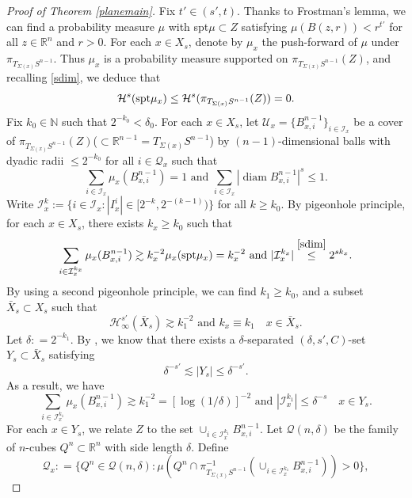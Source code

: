 \documentclass[11pt,a4paper,reqno]{amsart}
\newcommand{\R}{\mathbb{R}}
\newcommand{\calH}{\mathcal{H}}
\newcommand{\calQ}{\mathcal{Q}}
\newcommand{\1}{\mathbf{1}}
\newcommand{\diam}{\operatorname{diam}}
\numberwithin{equation}{section}
\theoremstyle{plain}
\theoremstyle{definition}
\theoremstyle{remark}
\begin{document}
\begin{proof}[Proof of Theorem \ref{planemain}]
Fix $t' \in(s',t)$. Thanks to Frostman's lemma, we can find a probability measure $\mu$ with spt$\mu\subset Z$ satisfying $\mu (B(z,r)) <  r^{t'}$ for all $z \in \R^n$ and $r>0$. For each $x \in X_s$, denote by $\mu_x$ the push-forward of $\mu$ under $\pi_{T_{\Sigma(x)}S^{n-1}}$. Thus $\mu_x$ is a probability measure supported on
$\pi_{T_{\Sigma(x)}S^{n-1}}(Z)$, and recalling \eqref{sdim}, we deduce that
$$\calH^{s}({\rm spt}\mu_x)  \le \calH^{s}(\pi_{T_{\Sigma(x)}S^{n-1}}(Z))=0.$$
   Fix $k_0 \in\mathbb{N}$ such that $2^{-k_0} < \delta_0$. For each $x \in X_s$, let $\mathcal{U}_x = \{ B_{x,i}^{n-1}\}_{i \in\mathcal{I}_x}$ be a cover of $\pi_{T_{\Sigma(x)}S^{n-1}}(Z)$($\subset\R^{n-1}=T_{\Sigma(x)}S^{n-1}$)
by $(n-1)$-dimensional balls with dyadic radii $\le 2^{-k_0}$ for all $i \in \mathcal{Q}_x$ such that
$$  \sum_{i \in \mathcal{I}_x}\mu_x(B_{x,i}^{n-1}) =1 \mbox{ and }  \sum_{i \in \mathcal{I}_x} |\diam B_{x,i}^{n-1}|^{s} \le 1.     $$
Write $\mathcal{I}_x^k:= \{ i \in \mathcal{I}_x : | I_x^i|\in [2^{-k},2^{-(k-1)})\}$ for all $k \ge k_0$.
By pigeonhole principle, for each $x \in X_s$, there exists $k_x \ge k_0$ such that
$$    \sum_{i \in \mathcal{I}_x^{k_x}}\mu_{x}(B_{x,i}^{n-1})  \gtrsim k_x^{-2}\mu_{x}({\rm spt}\mu_{x} ) = k_x^{-2} \mbox{ and } |\mathcal{I}_x^{k_x}|  \overset{\eqref{sdim}}{\le} 2^{sk_x}.  $$
By using a second pigeonhole principle, we can find $k_1 \ge k_0$, and a subset $\bar X_s \subset X_s$ such that
  $$  \mathcal{H}^{s'}_\infty(\bar X_s)  \gtrsim k_1^{-2} \mbox{ and } k_x \equiv k_1 \quad x \in \bar X_s.  $$
Let $\delta: = 2^{-k_1}$.
  By \cite[Lemma 2.7]{orponen2023hausdorff}, we know that there exists a $\delta$-separated $(\delta,s',C)$-set $Y_s \subset \bar X_s$ satisfying
  \begin{equation}\label{cardy}
    \delta^{-s'} \lesssim |Y_s| \leq \delta^{-s'}.
  \end{equation}
  As a result, we have
  \begin{equation}\label{upb2}
    \sum_{i \in \mathcal{I}_x^{k_1}}\mu_{x}(B_{x,i}^{n-1}) \gtrsim k_1^{-2} = [\log(1/\delta)]^{-2}  \mbox{ and } |\mathcal{I}_x^{k_1}|  \le \delta^{-s} \quad x \in Y_s.
  \end{equation}
For each $x\in Y_s$, we relate $Z$ to the set $\cup_{i \in \mathcal{I}_x^{k_1}}B_{x,i}^{n-1}$. Let $\calQ(n,\delta)$ be the family of $n$-cubes $Q^n \subset\R^n$ with side length $\delta$.
Define
\begin{equation}\label{qxk}
  \calQ_x : = \{Q^n \in \calQ(n,\delta): \mu(Q^n \cap \pi_{T_{\Sigma(x)}S^{n-1}}^{-1}(\cup_{i \in \mathcal{I}_x^{k_1}}B_{x,i}^{n-1})) >0\},

\end{equation}
\end{proof}
\end{document}
